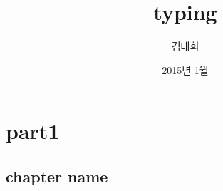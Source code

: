\documentclass[12pt,a4paper]{book}
\begin{document}
	
			\dominitoc
			

			\title{typing}
			\author{김대희}
			\date{2015년 1월}
			\maketitle


			\tableofcontents
			\listoffigures
			\listoftables

			


\newpage
\part{part1}

\newpage
\chapter{chapter name}
\end{document}
